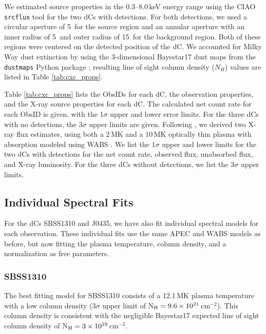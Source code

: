 \documentclass[twocolumn, tighten, times, astrosymb]{aastex631}
\begin{document}
We estimated source properties in the $0.3$--$8.0$\,keV energy range using the CIAO \texttt{srcflux} tool for the two dCs with detections. For both detections, we used a circular aperture of 5\arcsec\ for the source region and an annular aperture with an inner radius of 5\arcsec\ and outer radius of 15\arcsec\ for the background region. Both of these regions were centered on the detected position of the dC. We accounted for Milky Way dust extinction by using the 3-dimensional Bayestar17 \citep{Bayestar2017} dust maps from the \texttt{dustmaps} Python package \citep{dustmaps}; resulting line of sight column density ($N_H$) values are listed in Table \ref{tab:cxc_props}. 



Table \ref{tab:cxc_props} lists the ObsIDs for each dC, the observation properties, and the X-ray source properties for each dC. The calculated net count rate for each ObsID is given, with the $1\sigma$ upper and lower error limits. For the three dCs with no detections, the $3\sigma$ upper limits are given. Following \citet{Green2019}, we derived two X-ray flux estimates, using both a 2\,MK and a 10\,MK optically thin plasma \citep[APEC;][]{Smith2001} with absorption modeled using WABS \citep{Morrison1983}. We list the $1\sigma$ upper and lower limits for the two dCs with detections for the net count rate, observed flux, unabsorbed flux, and X-ray luminosity. For the three dCs without detections, we list the $3\sigma$ upper limits.


\subsection{Individual Spectral Fits}\label{sec:indiv_fits}

For the dCs SBSS1310 and J0435, we have also fit individual spectral models for each observation. These individual fits use the same APEC and WABS models as before, but now fitting the plasma temperature, column density, and a normalization as free parameters.

\subsubsection{SBSS1310}\label{sec:SBSS1310_indfit}

The best fitting model for SBSS1310 consists of a 12.1\,MK plasma temperature with a low column density ($3\sigma$ upper limit of N$_{\rm H} = 9.6\times10^{21}$\,cm$^{-2}$). This column density is consistent with the negligible Bayestar17 expected line of sight column density of N$_{\rm H} = 3\times10^{19}$\,cm$^{-2}$. 
\end{document}
